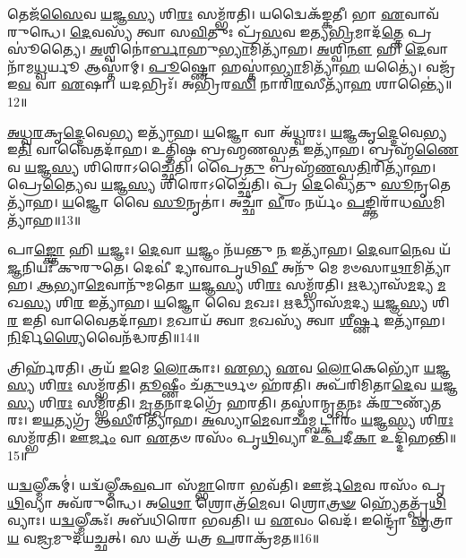 𑌤𑍇𑌜᳴\-\ul{𑌸𑍈}\-𑌵 \ul{𑌯}\-𑌜𑍍𑌞\-\ul{𑌸𑍍𑌯} 𑌶𑌿\-\ul{𑌰𑌃} 𑌸𑌮𑍍𑌭᳴𑌰𑌤𑌿। 
𑌯𑌦𑍍𑌵𑍈𑌕᳴𑌙𑍍𑌕𑌤𑍀। 
𑌭𑌾 \ul{𑌏}\-𑌵𑌾𑌵᳴𑌰𑍁𑌨𑍍𑌧𑍇। 
\-\ul{𑌦𑍇}\-𑌵𑌸𑍍𑌯᳴ 𑌤𑍍𑌵𑌾 𑌸\-\ul{𑌵𑌿}\-𑌤𑍁𑌃 𑌪𑍍𑌰᳴\-\ul{𑌸}\-𑌵 𑌇𑌤𑍍𑌯\-\ul{𑌭𑍍𑌰𑌿}\-𑌮𑌾𑌦᳴\-\ul{𑌤𑍍𑌤𑍇} 𑌪𑍍𑌰𑌸𑍂॑𑌤𑍍𑌯𑍈। 
\-\ul{𑌅}\-𑌶𑍍𑌵𑌿𑌨𑍋॑\-\ul{𑌰𑍍𑌬𑌾}\-𑌹𑍁\-\ul{𑌭𑍍𑌯𑌾}\-\-𑌮𑌿𑌤𑍍𑌯𑌾᳴𑌹। 
\-\ul{𑌅}\-𑌶𑍍𑌵𑌿\-\ul{𑌨𑍗} 𑌹𑌿 \ul{𑌦𑍇}\-𑌵𑌾𑌨𑌾᳴𑌮\-\ul{𑌧𑍍𑌵}\-𑌰𑍍𑌯𑍂 𑌆𑌸𑍍𑌤𑌾॑𑌮𑍍। 
\-\ul{𑌪𑍂}\-𑌷𑍍𑌣𑍋 𑌹𑌸𑍍𑌤𑌾॑\-\ul{𑌭𑍍𑌯𑌾}\-𑌮𑌿𑌤𑍍𑌯𑌾᳴\-\ul{𑌹} 𑌯𑌤𑍍𑌯𑍈॑। 
𑌵𑌜𑍍𑌰᳴ 𑌇\-\ul{𑌵} 𑌵𑌾 \ul{𑌏}\-𑌷𑌾। 
𑌯𑌦𑌭𑍍𑌰𑌿𑌃᳴। 
𑌅𑌭𑍍𑌰𑌿᳴𑌰\-\ul{𑌸𑌿} 𑌨𑌾𑌰𑌿᳴\-\ul{𑌰}\-𑌸𑍀𑌤𑍍𑌯𑌾᳴\-\ul{𑌹} 𑌶𑌾𑌨𑍍𑌤𑍍𑌯𑍈॑॥12॥

\-\ul{𑌅}\-\-\ul{𑌧𑍍𑌵}\-\-\ul{𑌰}\-𑌕𑍃\-\ul{𑌦𑍍𑌦𑍇}\-𑌵𑍇\-\ul{𑌭𑍍𑌯} 𑌇𑌤𑍍𑌯𑌾᳴𑌹। 
\-\ul{𑌯}\-𑌜𑍍𑌞𑍋 𑌵𑌾 𑌅᳴\-\ul{𑌧𑍍𑌵}\-𑌰𑌃। 
\-\ul{𑌯}\-\-\ul{𑌜𑍍𑌞}\-𑌕𑍃\-\ul{𑌦𑍍𑌦𑍇}\-𑌵𑍇\-\ul{𑌭𑍍𑌯} 𑌇\-\ul{𑌤𑌿} 𑌵𑌾𑌵𑍈𑌤𑌦𑌾᳴𑌹। 
𑌉𑌤𑍍𑌤𑌿᳴𑌷𑍍𑌠 𑌬𑍍𑌰𑌹𑍍𑌮𑌣𑌸𑍍𑌪\-\ul{𑌤} 𑌇𑌤𑍍𑌯𑌾᳴𑌹। 
𑌬𑍍𑌰𑌹𑍍𑌮᳴\-\ul{𑌣𑍈}\-𑌵 \ul{𑌯}\-𑌜𑍍𑌞\-\ul{𑌸𑍍𑌯} 𑌶𑌿𑌰𑍋𑌽𑌚𑍍𑌛𑍈᳴𑌤𑌿। 
𑌪𑍍𑌰𑍈\-\ul{𑌤𑍁} 𑌬𑍍𑌰𑌹𑍍𑌮᳴\-\ul{𑌣}\-𑌸𑍍𑌪\-\ul{𑌤𑌿}\-𑌰𑌿𑌤𑍍𑌯𑌾᳴𑌹। 
𑌪𑍍𑌰𑍇\-\ul{𑌤𑍍𑌯𑍈}\-𑌵 \ul{𑌯}\-𑌜𑍍𑌞\-\ul{𑌸𑍍𑌯} 𑌶𑌿𑌰𑍋𑌽𑌚𑍍𑌛𑍈᳴𑌤𑌿। 
𑌪𑍍𑌰 \ul{𑌦𑍇}\-𑌵𑍍𑌯𑍇᳴𑌤𑍁 \ul{𑌸𑍂}\-𑌨𑍃𑌤𑍇𑌤𑍍𑌯𑌾᳴𑌹। 
\-\ul{𑌯}\-𑌜𑍍𑌞𑍋 𑌵𑍈 \ul{𑌸𑍂}\-𑌨𑍃𑌤𑌾॑। 
𑌅𑌚𑍍𑌛𑌾᳴ \ul{𑌵𑍀}\-𑌰𑌂 𑌨𑌰𑍍𑌯𑌂᳴ \ul{𑌪}\-𑌙𑍍𑌕𑍍𑌤𑌿𑌰𑌾᳴𑌧\-\ul{𑌸}\-𑌮𑌿𑌤𑍍𑌯𑌾᳴𑌹॥13॥

𑌪𑌾\-\ul{𑌙𑍍𑌕𑍍𑌤𑍋} 𑌹𑌿 \ul{𑌯}\-𑌜𑍍𑌞𑌃। 
\-\ul{𑌦𑍇}\-𑌵𑌾 \ul{𑌯}\-𑌜𑍍𑌞𑌂 𑌨᳴𑌯𑌨𑍍𑌤𑍁 \ul{𑌨} 𑌇𑌤𑍍𑌯𑌾᳴𑌹। 
\-\ul{𑌦𑍇}\-𑌵𑌾\-\ul{𑌨𑍇}\-𑌵 𑌯᳴\-\ul{𑌜𑍍𑌞}\-𑌨𑌿𑌯𑌃᳴ 𑌕𑍁𑌰𑍁𑌤𑍇। 
𑌦𑍇𑌵𑍀॑ 𑌦𑍍𑌯𑌾𑌵𑌾𑌪𑍃𑌥𑌿\-\ul{𑌵𑍀} 𑌅𑌨𑍁᳴ 𑌮𑍇 𑌮𑍞𑌸𑌾\-\ul{𑌥𑌾}\-𑌮𑌿𑌤𑍍𑌯𑌾᳴𑌹। 
\-\ul{𑌆}\-𑌭𑍍𑌯𑌾\-\ul{𑌮𑍇}\-𑌵𑌾𑌨𑍁᳴𑌮𑌤𑍋 \ul{𑌯}\-𑌜𑍍𑌞\-\ul{𑌸𑍍𑌯} 𑌶𑌿\-\ul{𑌰𑌃} 𑌸𑌮𑍍𑌭᳴𑌰𑌤𑌿। 
\-\ul{𑌋}\-𑌦𑍍𑌧𑍍𑌯𑌾𑌸᳴\-\ul{𑌮}\-𑌦𑍍𑌯 \ul{𑌮}\-𑌖\-\ul{𑌸𑍍𑌯} 𑌶𑌿\-\ul{𑌰} 𑌇𑌤𑍍𑌯𑌾᳴𑌹। 
\-\ul{𑌯}\-𑌜𑍍𑌞𑍋 𑌵𑍈 \ul{𑌮}\-𑌖𑌃। 
\-\ul{𑌋}\-𑌦𑍍𑌧𑍍𑌯𑌾𑌸᳴\-\ul{𑌮}\-𑌦𑍍𑌯 \ul{𑌯}\-𑌜𑍍𑌞\-\ul{𑌸𑍍𑌯} 𑌶𑌿\-\ul{𑌰} 𑌇𑌤𑌿 𑌵𑌾𑌵𑍈𑌤𑌦𑌾᳴𑌹। 
\-\ul{𑌮}\-𑌖𑌾𑌯᳴ 𑌤𑍍𑌵𑌾 \ul{𑌮}\-𑌖𑌸𑍍𑌯᳴ 𑌤𑍍𑌵𑌾 \ul{𑌶𑍀}\-𑌰𑍍𑌷𑍍𑌣 𑌇𑌤𑍍𑌯𑌾᳴𑌹। 
\-\ul{𑌨𑌿}\-𑌰𑍍𑌦𑌿\-\ul{𑌶𑍍𑌯𑍈}\-𑌵𑍈𑌨᳴𑌦𑍍𑌧𑌰𑌤𑌿॥14॥

𑌤𑍍𑌰𑌿𑌰𑍍\mbox{}𑌹᳴𑌰𑌤𑌿। 
𑌤𑍍𑌰𑌯᳴ \ul{𑌇}\-𑌮𑍇 \ul{𑌲𑍋}\-𑌕𑌾𑌃। 
\-\ul{𑌏}\-𑌭𑍍𑌯 \ul{𑌏}\-𑌵 \ul{𑌲𑍋}\-𑌕𑍇𑌭𑍍𑌯𑍋᳴ \ul{𑌯}\-𑌜𑍍𑌞\-\ul{𑌸𑍍𑌯} 𑌶𑌿\-\ul{𑌰𑌃} 𑌸𑌮𑍍𑌭᳴𑌰𑌤𑌿। 
\-\ul{𑌤𑍂}\-𑌷𑍍𑌣𑍀𑌂 𑌚᳴\-\ul{𑌤𑍁}\-𑌰𑍍𑌥𑍞 𑌹᳴𑌰𑌤𑌿। 
𑌅𑌪᳴𑌰𑌿𑌮𑌿𑌤𑌾\-\ul{𑌦𑍇}\-𑌵 \ul{𑌯}\-𑌜𑍍𑌞\-\ul{𑌸𑍍𑌯} 𑌶𑌿\-\ul{𑌰𑌃} 𑌸𑌮𑍍𑌭᳴𑌰𑌤𑌿। 
\-\ul{𑌮𑍃}\-\-\ul{𑌤𑍍𑌖}\-𑌨𑌾𑌦𑌗𑍍𑌰𑍇᳴ 𑌹𑌰𑌤𑌿। 
𑌤𑌸𑍍𑌮𑌾॑𑌨𑍍𑌮𑍃\-\ul{𑌤𑍍𑌖}\-𑌨𑌃 𑌕᳴\-\ul{𑌰𑍁}\-𑌣𑍍𑌯᳴𑌤𑌰𑌃। 
𑌇\-\ul{𑌯}\-𑌤𑍍𑌯𑌗𑍍𑌰᳴ 𑌆\-\ul{𑌸𑍀}\-𑌰𑌿𑌤𑍍𑌯𑌾᳴𑌹। 
\-\ul{𑌅}\-𑌸𑍍𑌯𑌾\-\ul{𑌮𑍇}\-𑌵𑌾𑌛᳴𑌮𑍍𑌬𑌟𑍍𑌕𑌾𑌰𑌂 \ul{𑌯}\-𑌜𑍍𑌞\-\ul{𑌸𑍍𑌯} 𑌶𑌿\-\ul{𑌰𑌃} 𑌸𑌮𑍍𑌭᳴𑌰𑌤𑌿। 
𑌊\-\ul{𑌰𑍍𑌜𑌂} 𑌵𑌾 \ul{𑌏}\-𑌤𑍞 𑌰𑌸𑌂᳴ 𑌪𑍃\-\ul{𑌥𑌿}\-𑌵𑍍𑌯𑌾 𑌉᳴\-\ul{𑌪}\-𑌦𑍀\-\ul{𑌕𑌾} 𑌉𑌦𑍍𑌦𑌿᳴𑌹𑌨𑍍𑌤𑌿॥15॥

𑌯\-\ul{𑌦𑍍𑌵}\-𑌲𑍍𑌮𑍀𑌕𑌮𑍍॑। 
𑌯𑌦𑍍𑌵᳴𑌲𑍍𑌮𑍀𑌕\-\ul{𑌵}\-𑌪𑌾 𑌸᳴\-\ul{𑌮𑍍𑌭𑌾}\-𑌰𑍋 𑌭𑌵᳴𑌤𑌿। 
𑌊𑌰𑍍𑌜᳴\-\ul{𑌮𑍇}\-𑌵 𑌰𑌸𑌂᳴ 𑌪𑍃\-\ul{𑌥𑌿}\-𑌵𑍍𑌯𑌾 𑌅𑌵᳴𑌰𑍁𑌨𑍍𑌧𑍇। 
𑌅\-\ul{𑌥𑍋} 𑌶𑍍𑌰𑍋𑌤𑍍𑌰᳴\-\ul{𑌮𑍇}\-𑌵। 
𑌶𑍍𑌰𑍋\-\ul{𑌤𑍍𑌰}\-\-\ul{𑍟} 𑌹𑍍𑌯𑍇᳴𑌤𑌤𑍍𑌪𑍃᳴\-\ul{𑌥𑌿}\-𑌵𑍍𑌯𑌾𑌃। 
𑌯\-\ul{𑌦𑍍𑌵}\-𑌲𑍍𑌮𑍀𑌕𑌃᳴। 
𑌅𑌬᳴𑌧𑌿𑌰𑍋 𑌭𑌵𑌤𑌿। 
𑌯 \ul{𑌏}\-𑌵𑌂 𑌵𑍇𑌦᳴। 
𑌇𑌨𑍍𑌦𑍍𑌰𑍋᳴ \ul{𑌵𑍃}\-𑌤𑍍𑌰𑌾\-\ul{𑌯} 𑌵\-\ul{𑌜𑍍𑌰}\-𑌮𑍁𑌦᳴𑌯𑌚𑍍𑌛𑌤𑍍। 
𑌸 𑌯𑌤𑍍𑌰᳴ 𑌯𑌤𑍍𑌰 \ul{𑌪}\-𑌰𑌾𑌕𑍍𑌰᳴𑌮𑌤॥16॥

